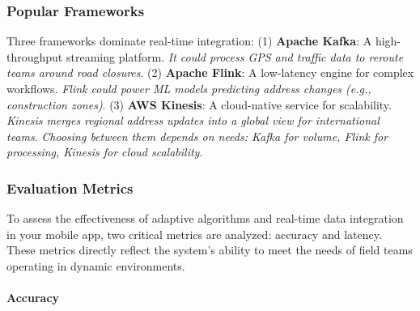         \subsubsection{Popular Frameworks}

        Three frameworks dominate real-time integration: (1) \textbf{Apache Kafka}: A high-throughput streaming platform. \textit{It could process GPS and traffic data to reroute teams around road closures}. (2) \textbf{Apache Flink}: A low-latency engine for complex workflows. \textit{Flink could power ML models predicting address changes (e.g., construction zones)}. (3) \textbf{AWS Kinesis}: A cloud-native service for scalability. \textit{Kinesis merges regional address updates into a global view for international teams}. \textit{Choosing between them depends on needs: Kafka for volume, Flink for processing, Kinesis for cloud scalability}.


        \subsubsection{Evaluation Metrics}
        \label{sec:evaluation-metrics}

        To assess the effectiveness of adaptive algorithms and real-time data integration in your mobile app, two critical metrics are analyzed: accuracy and latency. These metrics directly reflect the system’s ability to meet the needs of field teams operating in dynamic environments.

        \paragraph{Accuracy}
        \label{par:accuracy}

